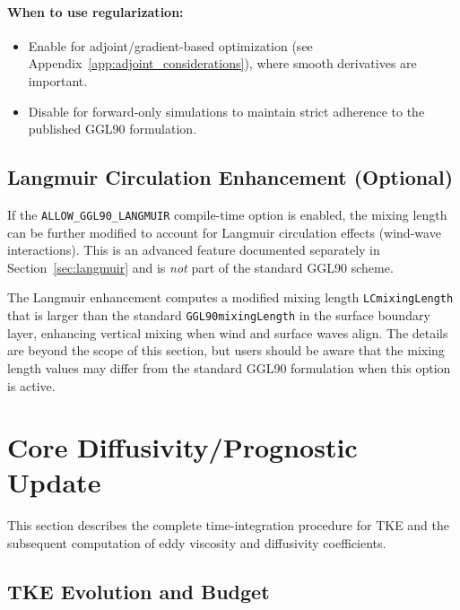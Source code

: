 \documentclass[12pt,letterpaper]{article}
\begin{document}
\paragraph{When to use regularization:}
\begin{itemize}
\item Enable for adjoint/gradient-based optimization (see Appendix~\ref{app:adjoint_considerations}), where smooth derivatives are important.
\item Disable for forward-only simulations to maintain strict adherence to the published GGL90 formulation.
\end{itemize}

\subsection{Langmuir Circulation Enhancement (Optional)}
\label{sec:mxl_langmuir}

If the \verb|ALLOW_GGL90_LANGMUIR| compile-time option is enabled, the mixing length can be further modified to account for Langmuir circulation effects (wind-wave interactions). This is an advanced feature documented separately in Section~\ref{sec:langmuir} and is \emph{not} part of the standard GGL90 scheme.

The Langmuir enhancement computes a modified mixing length \verb|LCmixingLength| that is larger than the standard \verb|GGL90mixingLength| in the surface boundary layer, enhancing vertical mixing when wind and surface waves align. The details are beyond the scope of this section, but users should be aware that the mixing length values may differ from the standard GGL90 formulation when this option is active.

\section{Core Diffusivity/Prognostic Update}
\label{sec:core_update}

This section describes the complete time-integration procedure for TKE and the subsequent computation of eddy viscosity and diffusivity coefficients.

\subsection{TKE Evolution and Budget}
\label{sec:tke_evolution}
\end{document}
